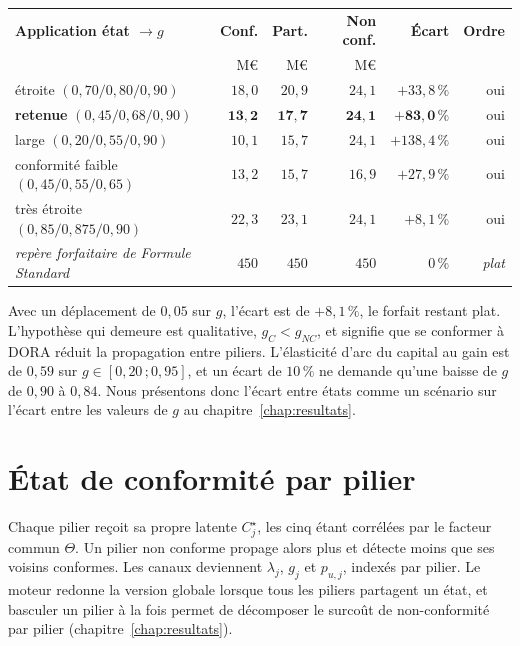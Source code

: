 \begin{center}\small
\renewcommand{\arraystretch}{1.25}
\begin{tabular}{@{}l r r r r r@{}}
\toprule
\textbf{Application état $\to g$} & \textbf{Conf.} & \textbf{Part.} & \textbf{Non conf.} &
\textbf{Écart} & \textbf{Ordre} \\
 & M\euro & M\euro & M\euro & & \\
\midrule
étroite $(0{,}70 / 0{,}80 / 0{,}90)$ & $18{,}0$ & $20{,}9$ & $24{,}1$ & $+33{,}8\,\%$ & oui \\
\textbf{retenue} $(0{,}45 / 0{,}68 / 0{,}90)$ & $\mathbf{13{,}2}$ & $\mathbf{17{,}7}$ &
$\mathbf{24{,}1}$ & $\mathbf{+83{,}0\,\%}$ & oui \\
large $(0{,}20 / 0{,}55 / 0{,}90)$ & $10{,}1$ & $15{,}7$ & $24{,}1$ & $+138{,}4\,\%$ & oui \\
conformité faible $(0{,}45 / 0{,}55 / 0{,}65)$ & $13{,}2$ & $15{,}7$ & $16{,}9$ &
$+27{,}9\,\%$ & oui \\
très étroite $(0{,}85 / 0{,}875 / 0{,}90)$ & $22{,}3$ & $23{,}1$ & $24{,}1$ & $+8{,}1\,\%$ &
oui \\
\midrule
\emph{repère forfaitaire de Formule Standard} & $450$ & $450$ & $450$ & $0\,\%$ & \emph{plat} \\
\bottomrule
\end{tabular}
\end{center}

\vspace{2pt}
\noindent Avec un déplacement de $0{,}05$ sur $g$, l'écart est de $+8{,}1\,\%$, le forfait restant plat. L'hypothèse qui demeure est qualitative, $g_C < g_{NC}$, et signifie que se conformer à
DORA réduit la propagation entre piliers. L'élasticité d'arc du capital au gain est de $0{,}59$ sur
$g \in [0{,}20\,;0{,}95]$, et un écart de $10\,\%$ ne demande qu'une baisse de $g$ de $0{,}90$ à
$0{,}84$. Nous présentons donc l'écart entre états comme un scénario sur l'écart entre les valeurs de $g$ au
chapitre~\ref{chap:resultats}.

\section{État de conformité par pilier}
\label{sec:etat-par-pilier}

Chaque pilier reçoit sa propre latente $C^\star_j$, les cinq étant corrélées par le facteur commun
$\Theta$. Un pilier non conforme propage alors plus et détecte moins que ses voisins conformes. Les
canaux deviennent $\lambda_j$, $g_j$ et $p_{u,j}$, indexés par pilier. Le moteur redonne
la version globale lorsque tous les piliers partagent un état, et basculer un pilier à la
fois permet de décomposer le surcoût de non-conformité par pilier (chapitre~\ref{chap:resultats}).


